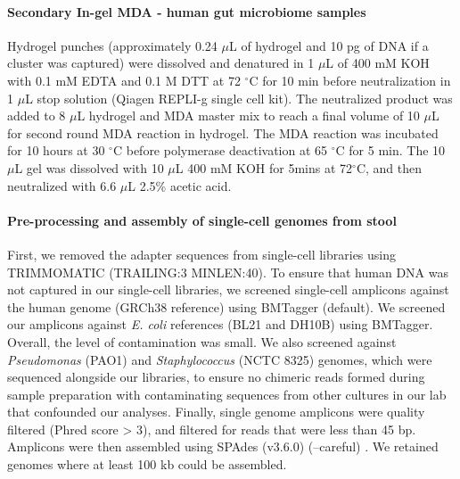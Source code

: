 \paragraph{Secondary In-gel MDA - human gut microbiome samples}
Hydrogel punches (approximately 0.24 $\mu$L of hydrogel and 10 pg of DNA if a cluster was captured) were dissolved and denatured in 1 $\mu$L of 400 mM KOH with 0.1 mM EDTA and 0.1 M DTT at 72 $^{\circ}$C for 10 min before neutralization in 1 $\mu$L stop solution (Qiagen REPLI-g single cell kit). The neutralized product was added to 8 $\mu$L hydrogel and MDA master mix to reach a final volume of 10 $\mu$L for second round MDA reaction in hydrogel. The MDA reaction was incubated for 10 hours at 30 $^{\circ}$C before polymerase deactivation at 65 $^{\circ}$C for 5 min. The 10 $\mu$L gel was dissolved with 10 $\mu$L 400 mM KOH for 5mins at 72$^{\circ}$C, and then neutralized with 6.6 $\mu$L 2.5\% acetic acid.

\paragraph{Pre-processing and assembly of single-cell genomes from stool}
First, we removed the adapter sequences from single-cell libraries using TRIMMOMATIC \cite{Bolger:2014ek} (TRAILING:3 MINLEN:40). To ensure that human DNA was not captured in our single-cell libraries, we screened single-cell amplicons against the human genome (GRCh38 reference) using BMTagger \cite{Rotmistrovsky:CVigB6Il}(default). We screened our amplicons against \textit{E. coli} references (BL21 and DH10B) using BMTagger. Overall, the level of contamination was small. We also screened against \textit{Pseudomonas} (PAO1) and \textit{Staphylococcus} (NCTC 8325) genomes, which were sequenced alongside our libraries, to ensure no chimeric reads formed during sample preparation with contaminating sequences from other cultures in our lab that confounded our analyses. Finally, single genome amplicons were quality filtered (Phred score > 3), and filtered for reads that were less than 45 bp. Amplicons were then assembled using SPAdes (v3.6.0) (--careful) \cite{Bankevich:2012ih}. We retained genomes where at least 100 kb could be assembled.

